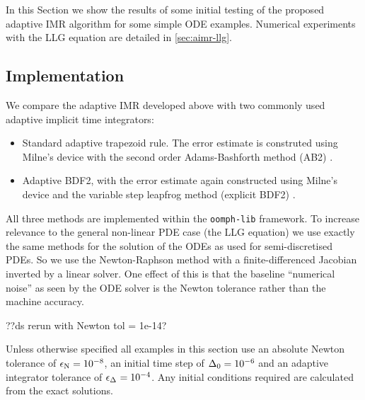 
In this Section we show the results of some initial testing of the proposed adaptive IMR algorithm for some simple ODE examples.
Numerical experiments with the LLG equation are detailed in \autoref{sec:aimr-llg}.


\subsection{Implementation}
\label{sec:aimr-implementation}

We compare the adaptive IMR developed above with two commonly used adaptive implicit time integrators:
\begin{itemize}
\item Standard adaptive trapezoid rule. 
  The error estimate is construted using Milne's device with the second order Adams-Bashforth method (AB2) \cite[pg. 707]{GreshoSani}.
\item Adaptive BDF2, with the error estimate again constructed using Milne's device and the variable step leapfrog method (\ie explicit BDF2) \cite[pg. 715]{GreshoSani}.
\end{itemize}

All three methods are implemented within the \texttt{oomph-lib} framework.
To increase relevance to the general non-linear PDE case (\ie the LLG equation) we use exactly the same methods for the solution of the ODEs as used for semi-discretised PDEs.
So we use the Newton-Raphson method with a finite-differenced Jacobian inverted by a linear solver.
One effect of this is that the baseline ``numerical noise'' as seen by the ODE solver is the Newton tolerance rather than the machine accuracy.

??ds rerun with Newton tol = 1e-14?

Unless otherwise specified all examples in this section use an absolute Newton tolerance of $\epsilon_{\text{N}} = 10^{-8}$, an initial time step of $\Delta_{0} = 10^{-6}$ and an adaptive integrator tolerance of $\epsilon_{\Delta_{}} = 10^{-4}$.
Any initial conditions required are calculated from the exact solutions.

